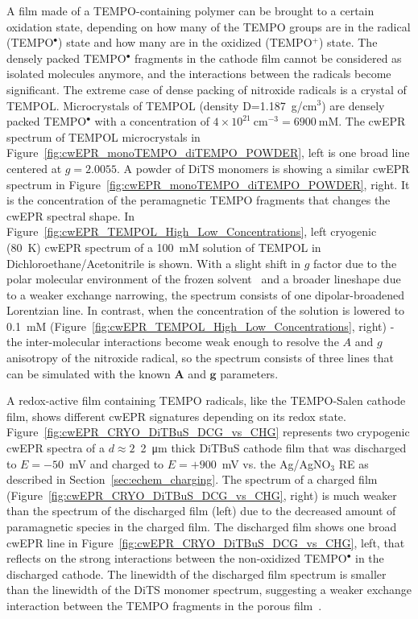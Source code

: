 A film made of a TEMPO-containing polymer can be brought to a certain oxidation state, depending on how many of the TEMPO groups are in the radical (TEMPO$^{\bullet}$) state and how many are in the oxidized (TEMPO$^{+}$) state. The densely packed TEMPO$^{\bullet}$ fragments in the cathode film cannot be considered as isolated molecules anymore, and the interactions between the radicals become significant. The extreme case of dense packing of nitroxide radicals is a crystal of TEMPOL. Microcrystals of TEMPOL (density D=1.187~g/cm$^3$) are densely packed TEMPO$^{\bullet}$ with a concentration of $4\times10^{21}~$cm$^{-3}=6900~$mM. The cwEPR spectrum of TEMPOL microcrystals in Figure~\ref{fig:cwEPR_monoTEMPO_diTEMPO_POWDER}, left is one broad line centered at $g=2.0055$. A powder of DiTS monomers is showing a similar cwEPR spectrum in Figure~\ref{fig:cwEPR_monoTEMPO_diTEMPO_POWDER}, right. It is the concentration of the peramagnetic TEMPO fragments that changes the cwEPR spectral shape. In Figure~\ref{fig:cwEPR_TEMPOL_High_Low_Concentrations}, left cryogenic (80~K) cwEPR spectrum of a 100~mM solution of TEMPOL in Dichloroethane/Acetonitrile is shown. With a slight shift in $g$ factor due to the polar molecular environment of the frozen solvent~\cite{Siavash} and a broader lineshape due to a weaker exchange narrowing, the spectrum consists of one dipolar-broadened Lorentzian line. In contrast, when the concentration of the solution is lowered to 0.1~mM (Figure~\ref{fig:cwEPR_TEMPOL_High_Low_Concentrations}, right) - the inter-molecular interactions become weak enough to resolve the $A$ and $g$ anisotropy of the nitroxide radical, so the spectrum consists of three lines that can be simulated with the known $\textbf{A}$ and $\textbf{g}$ parameters.\\
\par
A redox-active film containing TEMPO radicals, like the TEMPO-Salen cathode film, shows different cwEPR signatures depending on its redox state. Figure~\ref{fig:cwEPR_CRYO_DiTBuS_DCG_vs_CHG} represents two crypogenic cwEPR spectra of a $d\approx2$~\SI{2}{\micro\meter} thick DiTBuS cathode film that was discharged to $E=-50$~mV and charged to $E=+900$~mV vs. the Ag/AgNO$_3$ RE as described in Section~\ref{sec:echem_charging}. The spectrum of a charged film (Figure~\ref{fig:cwEPR_CRYO_DiTBuS_DCG_vs_CHG}, right) is much weaker than the spectrum of the discharged film (left) due to the decreased amount of paramagnetic species in the charged film. The discharged film shows one broad cwEPR line in Figure~\ref{fig:cwEPR_CRYO_DiTBuS_DCG_vs_CHG}, left, that reflects on the strong interactions between the non-oxidized TEMPO$^{\bullet}$ in the discharged cathode. The linewidth of the discharged film spectrum is smaller than the linewidth of the DiTS monomer spectrum, suggesting a weaker exchange interaction between the TEMPO fragments in the porous film~\cite{Vereshchagin2020}.\\
